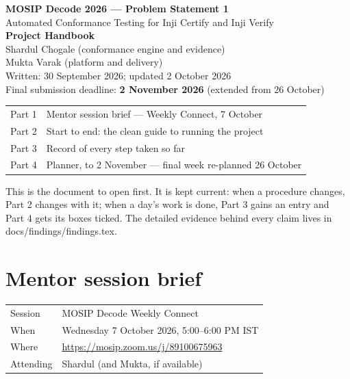 \documentclass[10pt,a4paper]{article}
\begin{document}
\begin{titlepage}
\vspace*{3cm}
{\Large\bfseries MOSIP Decode 2026 --- Problem Statement 1}\\[0.6em]
{\large Automated Conformance Testing for Inji Certify and Inji Verify}\\[2em]
{\LARGE\bfseries Project Handbook}\\[2em]
Shardul Chogale (conformance engine and evidence)\\
Mukta Varak (platform and delivery)\\[2em]
Written: 30 September 2026; updated 2 October 2026\\
Final submission deadline: \textbf{2 November 2026} (extended from 26 October)\\[3em]
\begin{tabular}{@{}ll@{}}
Part 1 & Mentor session brief --- Weekly Connect, 7 October\\
Part 2 & Start to end: the clean guide to running the project\\
Part 3 & Record of every step taken so far\\
Part 4 & Planner, to 2 November --- final week re-planned 26 October\\
\end{tabular}
\vfill
{\small This is the document to open first. It is kept current: when a procedure changes,
Part 2 changes with it; when a day's work is done, Part 3 gains an entry and Part 4 gets
its boxes ticked. The detailed evidence behind every claim lives in
docs/findings/findings.tex.}
\end{titlepage}

\tableofcontents
\newpage

\section{Mentor session brief}

\begin{tabular}{@{}ll@{}}
Session & MOSIP Decode Weekly Connect\\
When & Wednesday 7 October 2026, 5:00--6:00 PM IST\\
Where & \url{https://mosip.zoom.us/j/89100675963}\\
Attending & Shardul (and Mukta, if available)\\
\end{tabular}
\end{document}
